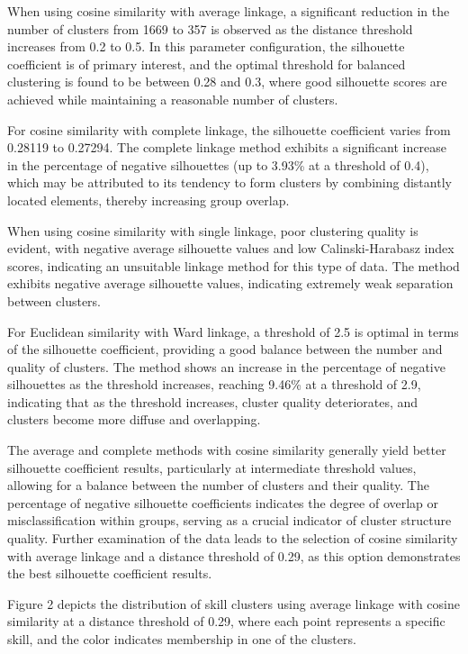 \begin{multicols}{2}
When using cosine similarity with average linkage, a significant
reduction in the number of clusters from 1669 to 357 is observed as the
distance threshold increases from 0.2 to 0.5. In this parameter
configuration, the silhouette coefficient is of primary interest, and
the optimal threshold for balanced clustering is found to be between
0.28 and 0.3, where good silhouette scores are achieved while
maintaining a reasonable number of clusters.

For cosine similarity with complete linkage, the silhouette coefficient
varies from 0.28119 to 0.27294. The complete linkage method exhibits a
significant increase in the percentage of negative silhouettes (up to
3.93\% at a threshold of 0.4), which may be attributed to its tendency
to form clusters by combining distantly located elements, thereby
increasing group overlap.

When using cosine similarity with single linkage, poor clustering
quality is evident, with negative average silhouette values and low
Calinski-Harabasz index scores, indicating an unsuitable linkage method
for this type of data. The method exhibits negative average silhouette
values, indicating extremely weak separation between clusters.

For Euclidean similarity with Ward linkage, a threshold of 2.5 is
optimal in terms of the silhouette coefficient, providing a good balance
between the number and quality of clusters. The method shows an increase
in the percentage of negative silhouettes as the threshold increases,
reaching 9.46\% at a threshold of 2.9, indicating that as the threshold
increases, cluster quality deteriorates, and clusters become more
diffuse and overlapping.

The average and complete methods with cosine similarity generally yield
better silhouette coefficient results, particularly at intermediate
threshold values, allowing for a balance between the number of clusters
and their quality. The percentage of negative silhouette coefficients
indicates the degree of overlap or misclassification within groups,
serving as a crucial indicator of cluster structure quality. Further
examination of the data leads to the selection of cosine similarity with
average linkage and a distance threshold of 0.29, as this option
demonstrates the best silhouette coefficient results.

Figure 2 depicts the distribution of skill clusters using average
linkage with cosine similarity at a distance threshold of 0.29, where
each point represents a specific skill, and the color indicates
membership in one of the clusters.
\end{multicols}


